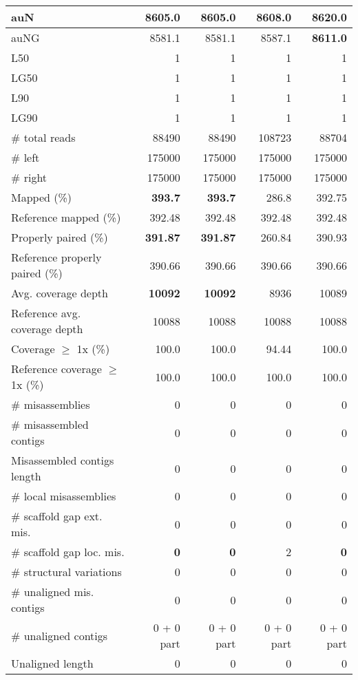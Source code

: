 \documentclass[12pt,a4paper]{article}
\begin{document}
\begin{table}[ht]
\begin{center}
\begin{tabular}{|l*{4}{|r}|}
auN & 8605.0 & 8605.0 & 8608.0 & {\bf 8620.0} \\ \hline
auNG & 8581.1 & 8581.1 & 8587.1 & {\bf 8611.0} \\ \hline
L50 & 1 & 1 & 1 & 1 \\ \hline
LG50 & 1 & 1 & 1 & 1 \\ \hline
L90 & 1 & 1 & 1 & 1 \\ \hline
LG90 & 1 & 1 & 1 & 1 \\ \hline
\# total reads & 88490 & 88490 & 108723 & 88704 \\ \hline
\# left & 175000 & 175000 & 175000 & 175000 \\ \hline
\# right & 175000 & 175000 & 175000 & 175000 \\ \hline
Mapped (\%) & {\bf 393.7} & {\bf 393.7} & 286.8 & 392.75 \\ \hline
Reference mapped (\%) & 392.48 & 392.48 & 392.48 & 392.48 \\ \hline
Properly paired (\%) & {\bf 391.87} & {\bf 391.87} & 260.84 & 390.93 \\ \hline
Reference properly paired (\%) & 390.66 & 390.66 & 390.66 & 390.66 \\ \hline
Avg. coverage depth & {\bf 10092} & {\bf 10092} & 8936 & 10089 \\ \hline
Reference avg. coverage depth & 10088 & 10088 & 10088 & 10088 \\ \hline
Coverage $\geq$ 1x (\%) & 100.0 & 100.0 & 94.44 & 100.0 \\ \hline
Reference coverage $\geq$ 1x (\%) & 100.0 & 100.0 & 100.0 & 100.0 \\ \hline
\# misassemblies & 0 & 0 & 0 & 0 \\ \hline
\# misassembled contigs & 0 & 0 & 0 & 0 \\ \hline
Misassembled contigs length & 0 & 0 & 0 & 0 \\ \hline
\# local misassemblies & 0 & 0 & 0 & 0 \\ \hline
\# scaffold gap ext. mis. & 0 & 0 & 0 & 0 \\ \hline
\# scaffold gap loc. mis. & {\bf 0} & {\bf 0} & 2 & {\bf 0} \\ \hline
\# structural variations & 0 & 0 & 0 & 0 \\ \hline
\# unaligned mis. contigs & 0 & 0 & 0 & 0 \\ \hline
\# unaligned contigs & 0 + 0 part & 0 + 0 part & 0 + 0 part & 0 + 0 part \\ \hline
Unaligned length & 0 & 0 & 0 & 0 \\ \hline

\end{tabular}
\end{center}
\end{table}
\end{document}
